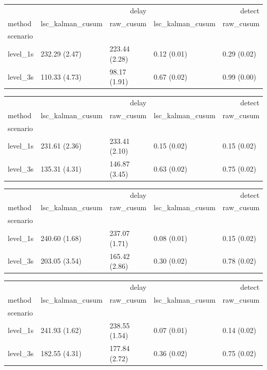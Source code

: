 \begin{tabular}{lllll}
\toprule
 & \multicolumn{2}{r}{delay} & \multicolumn{2}{r}{detect} \\
method & lsc_kalman_cusum & raw_cusum & lsc_kalman_cusum & raw_cusum \\
scenario &  &  &  &  \\
\midrule
level_1s & 232.29 (2.47) & 223.44 (2.28) & 0.12 (0.01) & 0.29 (0.02) \\
level_3s & 110.33 (4.73) & 98.17 (1.91) & 0.67 (0.02) & 0.99 (0.00) \\
\bottomrule
\end{tabular}

\begin{tabular}{lllll}
\toprule
 & \multicolumn{2}{r}{delay} & \multicolumn{2}{r}{detect} \\
method & lsc_kalman_cusum & raw_cusum & lsc_kalman_cusum & raw_cusum \\
scenario &  &  &  &  \\
\midrule
level_1s & 231.61 (2.36) & 233.41 (2.10) & 0.15 (0.02) & 0.15 (0.02) \\
level_3s & 135.31 (4.31) & 146.87 (3.45) & 0.63 (0.02) & 0.75 (0.02) \\
\bottomrule
\end{tabular}

\begin{tabular}{lllll}
\toprule
 & \multicolumn{2}{r}{delay} & \multicolumn{2}{r}{detect} \\
method & lsc_kalman_cusum & raw_cusum & lsc_kalman_cusum & raw_cusum \\
scenario &  &  &  &  \\
\midrule
level_1s & 240.60 (1.68) & 237.07 (1.71) & 0.08 (0.01) & 0.15 (0.02) \\
level_3s & 203.05 (3.54) & 165.42 (2.86) & 0.30 (0.02) & 0.78 (0.02) \\
\bottomrule
\end{tabular}

\begin{tabular}{lllll}
\toprule
 & \multicolumn{2}{r}{delay} & \multicolumn{2}{r}{detect} \\
method & lsc_kalman_cusum & raw_cusum & lsc_kalman_cusum & raw_cusum \\
scenario &  &  &  &  \\
\midrule
level_1s & 241.93 (1.62) & 238.55 (1.54) & 0.07 (0.01) & 0.14 (0.02) \\
level_3s & 182.55 (4.31) & 177.84 (2.72) & 0.36 (0.02) & 0.75 (0.02) \\
\bottomrule
\end{tabular}
